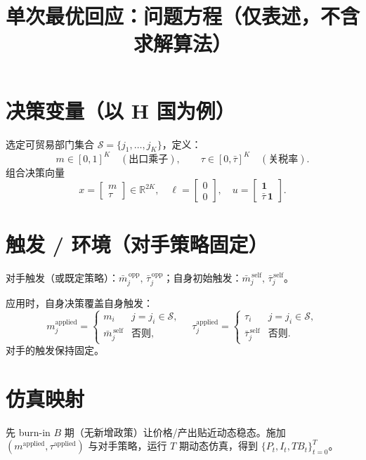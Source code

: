 \documentclass{article}
\title{单次最优回应：问题方程（仅表述，不含求解算法）}
\date{}
\begin{document}
\maketitle

\section*{决策变量（以 H 国为例）}
选定可贸易部门集合 $\mathcal{S}=\{j_1,\dots,j_K\}$，定义：
\[
m \in [0,1]^K \quad (\text{出口乘子}), \qquad
\tau \in [0,\bar{\tau}]^K \quad (\text{关税率}).
\]
组合决策向量
\[
x = \begin{bmatrix} m \\ \tau \end{bmatrix} \in \mathbb{R}^{2K},\quad
\ell = \begin{bmatrix} 0 \\ 0 \end{bmatrix},\quad
u = \begin{bmatrix} \mathbf{1} \\ \bar{\tau}\,\mathbf{1} \end{bmatrix}.
\]

\section*{触发 / 环境（对手策略固定）}
对手触发（或既定策略）：$\bar{m}^{\,\text{opp}}_j,\,\bar{\tau}^{\,\text{opp}}_j$；自身初始触发：$\bar{m}^{\,\text{self}}_j,\,\bar{\tau}^{\,\text{self}}_j$。

应用时，自身决策覆盖自身触发：
\[
m^{\text{applied}}_j =
\begin{cases}
m_i & j=j_i\in\mathcal{S},\\
\bar{m}^{\,\text{self}}_j & \text{否则},
\end{cases}
\quad
\tau^{\text{applied}}_j =
\begin{cases}
\tau_i & j=j_i\in\mathcal{S},\\
\bar{\tau}^{\,\text{self}}_j & \text{否则}.
\end{cases}
\]
对手的触发保持固定。

\section*{仿真映射}
先 burn-in $B$ 期（无新增政策）让价格/产出贴近动态稳态。施加 $(m^{\text{applied}}, \tau^{\text{applied}})$ 与对手策略，运行 $T$ 期动态仿真，得到 $\{P_t, I_t, TB_t\}_{t=0}^{T}$。
\end{document}
